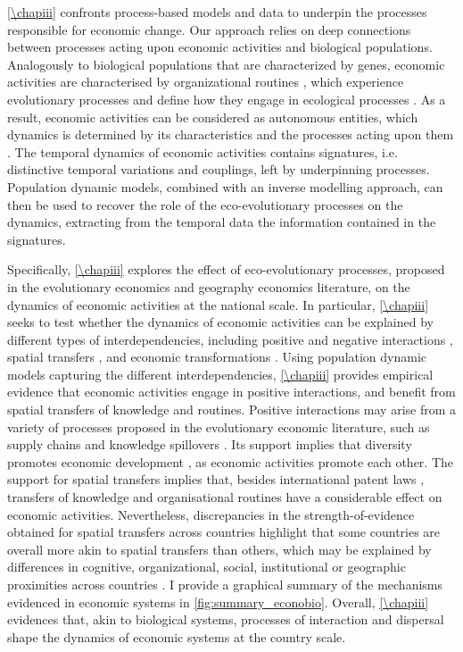 % 
% 
\cref{\chapiii} confronts process-based models and data to underpin the processes responsible for economic change.
% 
Our approach relies on deep connections between processes acting upon economic activities and biological populations.
% 
Analogously to biological populations that are characterized by genes, economic activities are characterised by organizational routines \citep{NelsonWinter}, which experience evolutionary processes and define how they engage in ecological processes \citep{NelsonWinter}.
% 
% 
As a result, economic activities can be considered as autonomous entities, which dynamics is determined by its characteristics and the processes acting upon them \citep{Boschma2005a}.
% 
The temporal dynamics of economic activities contains signatures, i.e. distinctive temporal variations and couplings, left by underpinning processes.
% 
Population dynamic models, combined with an inverse modelling approach, can then be used to recover the role of the eco-evolutionary processes on the dynamics, extracting from the temporal data the information contained in the signatures.

Specifically, \cref{\chapiii} explores the effect of eco-evolutionary processes, proposed in the evolutionary economics and geography economics literature, on the dynamics of economic activities at the national scale.
% 
In particular, \cref{\chapiii} seeks to test whether the dynamics of economic activities can be explained by different types of interdependencies, including positive \xxx and negative interactions \xxx, spatial transfers \xxx, and economic transformations \xxx.
% 
Using population dynamic models capturing the different interdependencies, \cref{\chapiii} provides empirical evidence that economic activities engage in positive interactions, and benefit from spatial transfers of knowledge and routines.
% 
Positive interactions may arise from a variety of processes proposed in the evolutionary economic literature, such as supply chains \citep{Ozman2009,Saavedra2009a} and knowledge spillovers \citep{Menon2015}. 
% 
Its support implies that diversity promotes economic development \citep{Hidalgo2018}, as economic activities promote each other.
% 
The support for spatial transfers implies that, besides international patent laws \xxx, transfers of knowledge and organisational routines have a considerable effect on economic activities. Nevertheless, discrepancies in the strength-of-evidence obtained for spatial transfers across countries highlight that some countries are overall more akin to spatial transfers than others, which may be explained by differences in cognitive, organizational, social, institutional or geographic proximities across countries \xxx .
% 
I provide a graphical summary of the mechanisms evidenced in economic systems in \cref{fig:summary_econobio}. Overall, \cref{\chapiii} evidences that, akin to biological systems, processes of interaction and dispersal shape the dynamics of economic systems at the country scale.

